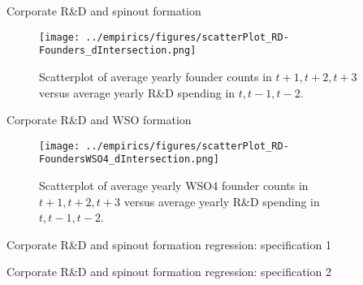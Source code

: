 \documentclass[english,usenames,dvipsnames]{beamer}
\begin{document}
\begin{frame}{Corporate R\&D and spinout formation}
	\begin{figure}[!htb]
		\centering
		\texttt{[image: ../empirics/figures/scatterPlot\_RD-Founders\_dIntersection.png]}
		\caption{Scatterplot of average yearly founder counts in $t+1,t+2,t+3$ versus average yearly R\&D spending in $t,t-1,t-2$.}
	\end{figure}
\end{frame}

\begin{frame}{Corporate R\&D and WSO formation}

\begin{figure}[!htb]
	\centering
	\texttt{[image: ../empirics/figures/scatterPlot\_RD-FoundersWSO4\_dIntersection.png]}
	\caption{Scatterplot of average yearly WSO4 founder counts in $t+1,t+2,t+3$ versus average yearly R\&D spending in $t,t-1,t-2$.}
	\end{figure}
\end{frame}



\begin{frame}{Corporate R\&D and spinout formation regression: specification 1}
	\begin{table}
		\Tiny
		\centering
		
		\caption{\tiny The dependent variable is average yearly number of founders joining startups in years $t+1,t+2,t+3$. The independent variables are averages over $t,t-1,t-2$. Firm controls are employment, assets, intangible assets, investment, net income, cumulative citation-weighted patents, and the product of Tobin's Q and Assets. Standard errors are clustered by firm.}
	\end{table}
\end{frame}

\begin{frame}{Corporate R\&D and spinout formation regression: specification 2}
\begin{table}
	\Tiny
	\centering
	
	\caption{\tiny The dependent variable is the average yearly number of founders from the parent firm joining startups in years $t+1,t+2,t+3$, normalized by a trailing five-year moving average of assets. Independent variables are also normalized by assets. Standard errors are clustered at the firm level.}
	\label{table:RDandSpinoutFormation_at_founder2_l3f3}
\end{table}
\end{frame}
\end{document}
